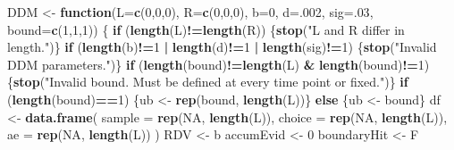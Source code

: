 \documentclass[
]{book}
\newenvironment{Shaded}{\begin{snugshade}}{\end{snugshade}}
\newcommand{\AttributeTok}[1]{\textcolor[rgb]{0.13,0.29,0.53}{#1}}
\newcommand{\ConstantTok}[1]{\textcolor[rgb]{0.56,0.35,0.01}{#1}}
\newcommand{\ControlFlowTok}[1]{\textcolor[rgb]{0.13,0.29,0.53}{\textbf{#1}}}
\newcommand{\DecValTok}[1]{\textcolor[rgb]{0.00,0.00,0.81}{#1}}
\newcommand{\FunctionTok}[1]{\textcolor[rgb]{0.13,0.29,0.53}{\textbf{#1}}}
\newcommand{\NormalTok}[1]{#1}
\newcommand{\OtherTok}[1]{\textcolor[rgb]{0.56,0.35,0.01}{#1}}
\newcommand{\SpecialCharTok}[1]{\textcolor[rgb]{0.81,0.36,0.00}{\textbf{#1}}}
\newcommand{\StringTok}[1]{\textcolor[rgb]{0.31,0.60,0.02}{#1}}
\begin{document}
\begin{Shaded}
\begin{Highlighting}[]
\NormalTok{DDM }\OtherTok{\textless{}{-}} \ControlFlowTok{function}\NormalTok{(}\AttributeTok{L=}\FunctionTok{c}\NormalTok{(}\DecValTok{0}\NormalTok{,}\DecValTok{0}\NormalTok{,}\DecValTok{0}\NormalTok{), }\AttributeTok{R=}\FunctionTok{c}\NormalTok{(}\DecValTok{0}\NormalTok{,}\DecValTok{0}\NormalTok{,}\DecValTok{0}\NormalTok{), }\AttributeTok{b=}\DecValTok{0}\NormalTok{, }\AttributeTok{d=}\NormalTok{.}\DecValTok{002}\NormalTok{, }\AttributeTok{sig=}\NormalTok{.}\DecValTok{03}\NormalTok{, }\AttributeTok{bound=}\FunctionTok{c}\NormalTok{(}\DecValTok{1}\NormalTok{,}\DecValTok{1}\NormalTok{,}\DecValTok{1}\NormalTok{)) \{}
  \ControlFlowTok{if}\NormalTok{ (}\FunctionTok{length}\NormalTok{(L)}\SpecialCharTok{!=}\FunctionTok{length}\NormalTok{(R)) \{}\FunctionTok{stop}\NormalTok{(}\StringTok{"L and R differ in length."}\NormalTok{)\}}
  \ControlFlowTok{if}\NormalTok{ (}\FunctionTok{length}\NormalTok{(b)}\SpecialCharTok{!=}\DecValTok{1} \SpecialCharTok{|} \FunctionTok{length}\NormalTok{(d)}\SpecialCharTok{!=}\DecValTok{1} \SpecialCharTok{|} \FunctionTok{length}\NormalTok{(sig)}\SpecialCharTok{!=}\DecValTok{1}\NormalTok{) \{}\FunctionTok{stop}\NormalTok{(}\StringTok{"Invalid DDM parameters."}\NormalTok{)\}}
  \ControlFlowTok{if}\NormalTok{ (}\FunctionTok{length}\NormalTok{(bound)}\SpecialCharTok{!=}\FunctionTok{length}\NormalTok{(L) }\SpecialCharTok{\&} \FunctionTok{length}\NormalTok{(bound)}\SpecialCharTok{!=}\DecValTok{1}\NormalTok{) \{}\FunctionTok{stop}\NormalTok{(}\StringTok{"Invalid bound. Must be defined at every time point or fixed."}\NormalTok{)\}}
  \ControlFlowTok{if}\NormalTok{ (}\FunctionTok{length}\NormalTok{(bound)}\SpecialCharTok{==}\DecValTok{1}\NormalTok{) \{ub }\OtherTok{\textless{}{-}} \FunctionTok{rep}\NormalTok{(bound, }\FunctionTok{length}\NormalTok{(L))\} }\ControlFlowTok{else}\NormalTok{ \{ub }\OtherTok{\textless{}{-}}\NormalTok{ bound\}}
\NormalTok{  df }\OtherTok{\textless{}{-}} \FunctionTok{data.frame}\NormalTok{(}
    \AttributeTok{sample =} \FunctionTok{rep}\NormalTok{(}\ConstantTok{NA}\NormalTok{, }\FunctionTok{length}\NormalTok{(L)),}
    \AttributeTok{choice =} \FunctionTok{rep}\NormalTok{(}\ConstantTok{NA}\NormalTok{, }\FunctionTok{length}\NormalTok{(L)),}
    \AttributeTok{ae =} \FunctionTok{rep}\NormalTok{(}\ConstantTok{NA}\NormalTok{, }\FunctionTok{length}\NormalTok{(L))}
\NormalTok{  )}
\NormalTok{  RDV }\OtherTok{\textless{}{-}}\NormalTok{ b}
\NormalTok{  accumEvid }\OtherTok{\textless{}{-}} \DecValTok{0}
\NormalTok{  boundaryHit }\OtherTok{\textless{}{-}}\NormalTok{ F}

\end{Highlighting}
\end{Shaded}
\end{document}
